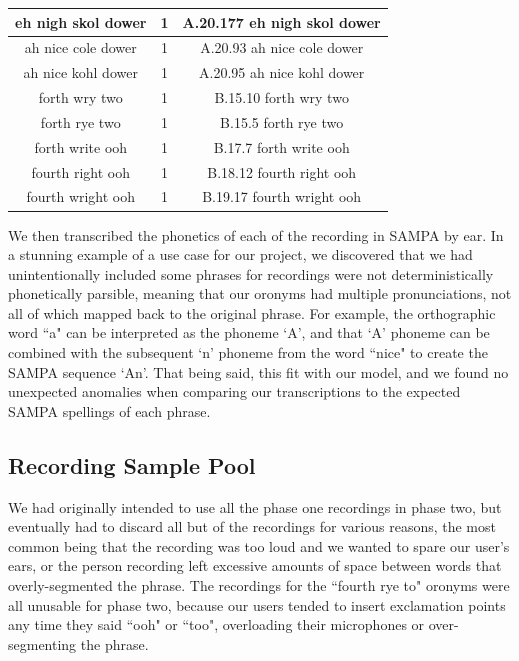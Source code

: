\begin{center}
\begin{longtable}{|c|c|c|}
\hline 
eh nigh skol dower   & 1 & A.20.177    eh nigh skol dower  \\
\hline 
ah nice cole dower   & 1 & A.20.93    ah nice cole dower  \\
\hline 
ah nice kohl dower   & 1 & A.20.95    ah nice kohl dower  \\
\hline 
forth wry two   & 1 & B.15.10    forth wry two  \\
\hline 
forth rye two   & 1 & B.15.5    forth rye two  \\
\hline 
forth write ooh   & 1 & B.17.7    forth write ooh  \\
\hline 
fourth right ooh   & 1 & B.18.12    fourth right ooh  \\
\hline 
fourth wright ooh   & 1 & B.19.17    fourth wright ooh  \\
\hline

\end{longtable}

\end{center}

We then transcribed the phonetics of each of the recording in SAMPA by ear.  In a stunning example of a use case for our project, we discovered that we had unintentionally included some phrases for recordings were not deterministically phonetically parsible, meaning that our oronyms had multiple pronunciations, not all of which mapped back to the original phrase.  For example, the orthographic word ``a" can be interpreted as the phoneme `A', and that `A' phoneme can be combined with the subsequent `n' phoneme from the word ``nice" to create the SAMPA sequence `An'.  That being said, this fit with our model, and we found no unexpected anomalies when comparing our transcriptions to the expected SAMPA spellings of each phrase.




\subsection{Recording Sample Pool}
\label{subsection:recordingSamplePool}
We had originally intended to use all the phase one recordings in phase two, but eventually had to discard all but \recordingsPhaseTwoUserStudy of the recordings for various reasons, the most common being that the recording was too loud and we wanted to spare our user's ears, or the person recording left excessive amounts of space between words that overly-segmented the phrase.  The recordings for the ``fourth rye to" oronyms were all unusable for phase two, because our users tended to insert exclamation points any time they said ``ooh" or ``too", overloading their microphones or over-segmenting the phrase.

